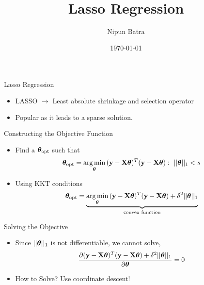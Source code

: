 \documentclass{beamer}
\title{Lasso Regression}
\date{\today}
\author{Nipun Batra}
\institute{IIT Gandhinagar}
\begin{document}
  \maketitle
  
\begin{frame}{Lasso Regression}
\begin{itemize}[<+->]
	
	
	\item LASSO $\longrightarrow$ Least absolute shrinkage and selection operator
	\item Popular as it leads to a sparse solution.
	
\end{itemize}
\end{frame}

\begin{frame}{Constructing the Objective Function}
\begin{itemize}[<+->]

\item Find a $\boldsymbol{\theta}_{\text{opt}}$ such that  \begin{equation}    \vtheta_{\text{opt}} =  \argmin_{\vtheta} {(\vy-\mX\vtheta)^T(\vy-\mX\vtheta)} : \ ||\vtheta||_1<s \end{equation}
\item Using KKT conditions
\begin{equation}
    \boldsymbol{\theta}_{\text{opt}} = \underbrace{\operatorname*{arg\,min}_{\boldsymbol{\theta}}{(\mathbf{y}-\mathbf{X}\boldsymbol{\theta})^T(\mathbf{y}-\mathbf{X}\boldsymbol{\theta}) + \delta^2||\boldsymbol{\theta}||_1}}_\text{convex function}
\end{equation}
	
\end{itemize}


\end{frame}

\begin{frame}{Solving the Objective}
\begin{itemize}[<+->]

\item Since $||\boldsymbol{\theta}||_1$ is not differentiable, we cannot solve,  \begin{equation}    \frac{\partial {(\mathbf{y}-\mathbf{X}\boldsymbol{\theta})^T(\mathbf{y}-\mathbf{X}\boldsymbol{\theta}) + \delta^2||\boldsymbol{\theta}||_1}}{\partial \boldsymbol{\theta}} = 0 \end{equation}

\item How to Solve?
Use coordinate descent!
\end{itemize}

\end{frame}
\end{document}
